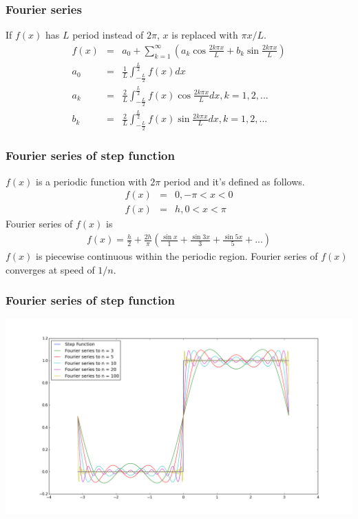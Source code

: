 \documentclass{beamer}
\begin{document}
\begin{frame}
\frametitle{Fourier series}
If $f(x)$ has $L$ period instead of $2\pi$, $x$ is replaced with $\pi x /L$.
\begin{eqnarray}
f(x)&=&a_0 + \sum_{k=1}^{\infty} \left(a_k\cos \frac{2k\pi x}{L} + b_k \sin \frac{2k\pi x}{L}\right) \nonumber \\
a_0&=&\frac{1}{L}\int_{-\frac{L}{2}}^{\frac{L}{2}}f(x) dx \nonumber \\
a_k&=&\frac{2}{L}\int_{-\frac{L}{2}}^{\frac{L}{2}}f(x) \cos \frac{2k\pi x}{L} dx, k = 1,2,...\nonumber \\
b_k&=&\frac{2}{L}\int_{-\frac{L}{2}}^{\frac{L}{2}}f(x) \sin \frac{2k\pi x}{L} dx, k = 1,2,...
\label{eq:fseries_pL}
\end{eqnarray}
\end{frame}
\begin{frame}
\frametitle{Fourier series of step function}
$f(x)$ is a periodic function with $2\pi$ period and it's defined as follows.
\begin{eqnarray}
f(x)&=& 0, -\pi < x < 0 \nonumber \\
f(x)&=& h, 0 < x < \pi
\label{eq:stepfunc}
\end{eqnarray}
Fourier series of $f(x)$ is
\begin{eqnarray}
f(x)= \frac{h}{2} + \frac{2h}{\pi} \left( \frac{\sin x}{1} + \frac{\sin 3x}{3} + \frac{\sin 5x}{5} + ...\right)
\label{eq:stepfunc_ft}
\end{eqnarray}
$f(x)$ is piecewise continuous within the periodic region. Fourier series of $f(x)$ converges at speed of $1/n$.
\end{frame}
\begin{frame}
\frametitle{Fourier series of step function}
\includegraphics[scale=0.3]{step.png}
\end{frame}
\end{document}
